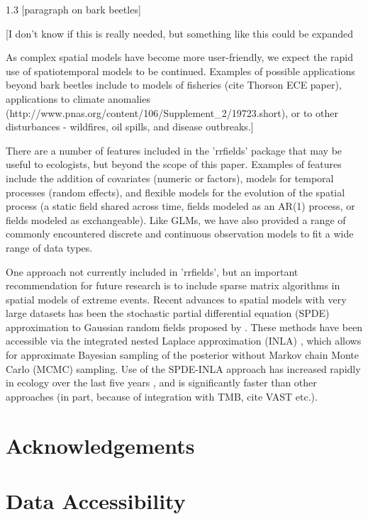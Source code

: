 \documentclass[12pt,english]{article}
\begin{document}
\begin{spacing}{1.3}
[paragraph on bark beetles]

[I don't know if this is really needed, but something like this could be expanded

As complex spatial models have become more user-friendly, we expect the rapid use
of spatiotemporal models to be continued. Examples of possible applications beyond
bark beetles include to models of fisheries (cite Thorson ECE paper), applications
to climate anomalies (http://www.pnas.org/content/106/Supplement\_2/19723.short),
or to other disturbances - wildfires, oil spills, and disease outbreaks.]

There are a number of features included in the 'rrfields' package that may be
useful to ecologists, but beyond the scope of this paper. Examples of features
include the addition of covariates (numeric or factors), models for temporal
processes (random effects), and flexible models for the evolution of the spatial
process (a static field shared across time, fields modeled as an AR(1) process,
or fields modeled as exchangeable). Like GLMs, we have also provided a range of
commonly encountered discrete and continuous observation models to fit a wide
range of data types.

One approach not currently included in 'rrfields', but an important recommendation
for future research is to include sparse matrix algorithms in spatial models of
extreme events. Recent advances to spatial models with very large datasets has
been the stochastic partial differential equation (SPDE)  approximation to
Gaussian random fields proposed by \citet{lindgren2011}. These methods have
been accessible via the integrated nested Laplace approximation (INLA)
\citep{rue2009}, which allows for approximate Bayesian sampling of the posterior
without Markov chain Monte Carlo (MCMC) sampling. Use of the SPDE-INLA approach has
increased rapidly in ecology over the last five years \citep[e.g.][]{illian2013, ono2016},
and is significantly faster than other approaches (in part, because of integration with
TMB, cite VAST etc.).

\section{Acknowledgements}

\section{Data Accessibility}


\end{spacing}
\end{document}
